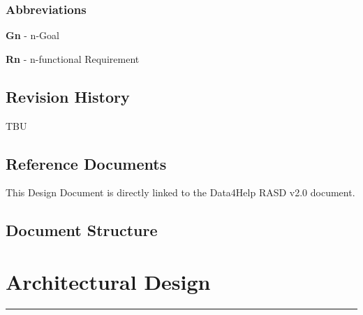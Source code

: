 \documentclass[12pt]{article}
\begin{document}
\subsubsection{Abbreviations}
\vspace{5mm}
\begin{flushleft}
\textbf{Gn} - n-Goal

\vspace{1.5mm}
\textbf{Rn} - n-functional Requirement
\end{flushleft}
\subsection{Revision History}
\vspace{5mm}
TBU
\subsection{Reference Documents}
\vspace{5mm}
This Design Document is directly linked to the Data4Help RASD v2.0 document.
\subsection{Document Structure}
\vspace{5mm}
\newpage
\section{Architectural Design}
\hrule
\vspace{1cm}
\end{document}

